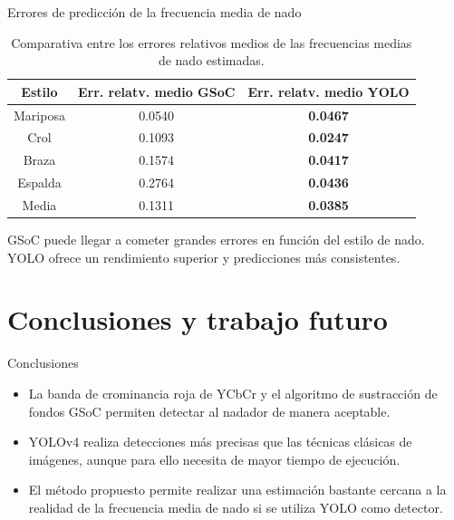 \documentclass[11pt]{beamer}
\begin{document}
    
    \begin{frame}{Errores de predicción de la frecuencia media de nado}
        \begin{table}
            \centering
            \begin{tabular}{|c|c|c|} \hline
                Estilo & Err. relatv. medio GSoC & Err. relatv. medio YOLO  \\ \hline
                Mariposa & 0.0540 & \textbf{0.0467} \\
                Crol & 0.1093 & \textbf{0.0247}  \\   
                Braza & 0.1574 & \textbf{0.0417} \\
                Espalda & 0.2764 & \textbf{0.0436} \\
                Media & 0.1311 & \textbf{0.0385} \\ \hline
            \end{tabular}
            \caption{Comparativa entre los errores relativos medios de las frecuencias medias de nado estimadas.}
            \label{tab:tablaerroresmediosprediccionesfrecuencia}
        \end{table}
        GSoC puede llegar a cometer grandes errores en función del estilo de nado. YOLO ofrece un rendimiento superior y predicciones más consistentes.
    \end{frame}

    \section{Conclusiones y trabajo futuro}
    
        \begin{frame}{Conclusiones}
            \begin{itemize}
                \item La banda de crominancia roja de YCbCr y el algoritmo de sustracción de fondos GSoC permiten detectar al nadador de manera aceptable.
                \item YOLOv4 realiza detecciones más precisas que las técnicas clásicas de imágenes, aunque para ello necesita de mayor tiempo de ejecución.
                \item El método propuesto permite realizar una estimación bastante cercana a la realidad de la frecuencia media de nado si se utiliza YOLO como detector.
            \end{itemize}
        \end{frame}
        
\end{document}

